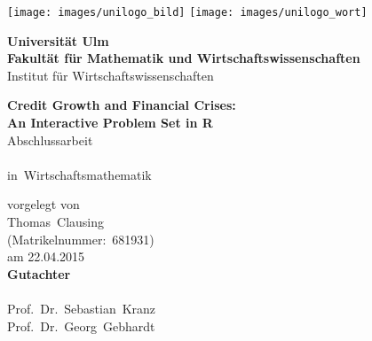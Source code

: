 \documentclass[a4paper,11pt,abstract=on]{scrartcl}
\title{}
\author{}
\date{}
\newcommand{\titel}{Credit Growth and Financial Crises: \\An Interactive Problem Set in R}
\newcommand{\type}{Abschlussarbeit}
\newcommand{\fullname}{Thomas Clausing}
\newcommand{\datum}{22.04.2015}
\newcommand{\matnr}{681931}
\newcommand{\gutachterA}{Prof.~Dr.~Sebastian Kranz}
\newcommand{\gutachterB}{Prof.~Dr.~Georg Gebhardt}
\newcommand{\fakultaet}{Mathematik und Wirtschaftswissenschaften}
\newcommand{\institut}{Institut für Wirtschaftswissenschaften}
\newcommand{\studiengang}{Wirtschaftsmathematik}
\begin{document}
\begin{titlepage}
\textwidth28cm
\texttt{[image: images/unilogo\_bild]}
\hfill
\texttt{[image: images/unilogo\_wort]}\\[1em]
\begin{center} 
{\large\bfseries Universität Ulm\\
	\vspace{0.5cm}
   Fakultät für \fakultaet\\
}
\vspace{0.5cm}
{\large \institut\\
}
\begin{figure}[h]
\centering

\end{figure}
\vspace{3cm}
{\LARGE\bfseries
\titel\\
}
\vspace{1cm}
{\Large
\type}\\
\mbox{}\\
\mbox{in \studiengang}
\end{center}
\vspace{3cm}
\begin{center}
vorgelegt von \\
\mbox{\fullname} \\
\mbox{(Matrikelnummer: \matnr)} \\
am \mbox{\datum}\\

\vspace*{1.2cm}
{\bf Gutachter} \\
\mbox{}\\
\mbox{\gutachterA}\\
\mbox{\gutachterB}\\
\end{center}
\vfill
\end{titlepage}

\newpage\thispagestyle{empty}


\maketitle
\end{document}
